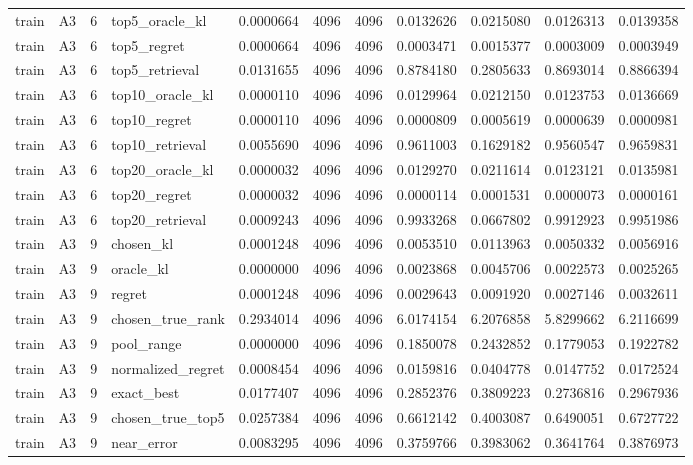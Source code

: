 \begin{tabular}{llrlrrrrrrr}
train & A3 & 6 & top5_oracle_kl & 0.0000664 & 4096 & 4096 & 0.0132626 & 0.0215080 & 0.0126313 & 0.0139358 \\
train & A3 & 6 & top5_regret & 0.0000664 & 4096 & 4096 & 0.0003471 & 0.0015377 & 0.0003009 & 0.0003949 \\
train & A3 & 6 & top5_retrieval & 0.0131655 & 4096 & 4096 & 0.8784180 & 0.2805633 & 0.8693014 & 0.8866394 \\
train & A3 & 6 & top10_oracle_kl & 0.0000110 & 4096 & 4096 & 0.0129964 & 0.0212150 & 0.0123753 & 0.0136669 \\
train & A3 & 6 & top10_regret & 0.0000110 & 4096 & 4096 & 0.0000809 & 0.0005619 & 0.0000639 & 0.0000981 \\
train & A3 & 6 & top10_retrieval & 0.0055690 & 4096 & 4096 & 0.9611003 & 0.1629182 & 0.9560547 & 0.9659831 \\
train & A3 & 6 & top20_oracle_kl & 0.0000032 & 4096 & 4096 & 0.0129270 & 0.0211614 & 0.0123121 & 0.0135981 \\
train & A3 & 6 & top20_regret & 0.0000032 & 4096 & 4096 & 0.0000114 & 0.0001531 & 0.0000073 & 0.0000161 \\
train & A3 & 6 & top20_retrieval & 0.0009243 & 4096 & 4096 & 0.9933268 & 0.0667802 & 0.9912923 & 0.9951986 \\
train & A3 & 9 & chosen_kl & 0.0001248 & 4096 & 4096 & 0.0053510 & 0.0113963 & 0.0050332 & 0.0056916 \\
train & A3 & 9 & oracle_kl & 0.0000000 & 4096 & 4096 & 0.0023868 & 0.0045706 & 0.0022573 & 0.0025265 \\
train & A3 & 9 & regret & 0.0001248 & 4096 & 4096 & 0.0029643 & 0.0091920 & 0.0027146 & 0.0032611 \\
train & A3 & 9 & chosen_true_rank & 0.2934014 & 4096 & 4096 & 6.0174154 & 6.2076858 & 5.8299662 & 6.2116699 \\
train & A3 & 9 & pool_range & 0.0000000 & 4096 & 4096 & 0.1850078 & 0.2432852 & 0.1779053 & 0.1922782 \\
train & A3 & 9 & normalized_regret & 0.0008454 & 4096 & 4096 & 0.0159816 & 0.0404778 & 0.0147752 & 0.0172524 \\
train & A3 & 9 & exact_best & 0.0177407 & 4096 & 4096 & 0.2852376 & 0.3809223 & 0.2736816 & 0.2967936 \\
train & A3 & 9 & chosen_true_top5 & 0.0257384 & 4096 & 4096 & 0.6612142 & 0.4003087 & 0.6490051 & 0.6727722 \\
train & A3 & 9 & near_error & 0.0083295 & 4096 & 4096 & 0.3759766 & 0.3983062 & 0.3641764 & 0.3876973 \\

\end{tabular}
